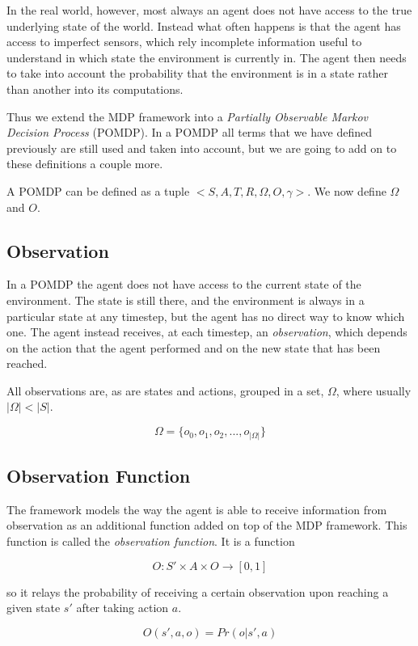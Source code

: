 In the real world, however, most always an agent does not have access to the true underlying state
of the world. Instead what often happens is that the agent has access to imperfect sensors, which
rely incomplete information useful to understand in which state the environment is currently in. The
agent then needs to take into account the probability that the environment is in a state rather than
another into its computations.

Thus we extend the MDP framework into a \textit{Partially Observable Markov Decision Process}
(POMDP). In a POMDP all terms that we have defined previously are still used and taken into account,
but we are going to add on to these definitions a couple more.

A POMDP can be defined as a tuple $<S,A,T,R,\Omega,O,\gamma>$. We now define $\Omega$ and $O$.

\subsection{Observation}\label{ref:obsspace}

In a POMDP the agent does not have access to the current state of the environment. The state is
still there, and the environment is always in a particular state at any timestep, but the agent has
no direct way to know which one. The agent instead receives, at each timestep, an
\textit{observation}, which depends on the action that the agent performed and on the new state that
has been reached.

All observations are, as are states and actions, grouped in a set, $\Omega$, where usually $|\Omega| <
|S|$.

\[ \Omega = \{ o_0, o_1, o_2, ..., o_{|\Omega|} \} \]

\subsection{Observation Function}

The framework models the way the agent is able to receive information from observation as an
additional function added on top of the MDP framework. This function is called the
\textit{observation function}. It is a function

\[ O : S' \times A \times O \rightarrow [0,1] \]

so it relays the probability of receiving a certain observation upon reaching a given state $s'$
after taking action $a$.

\[ O(s', a, o) = Pr(o | s', a) \]

